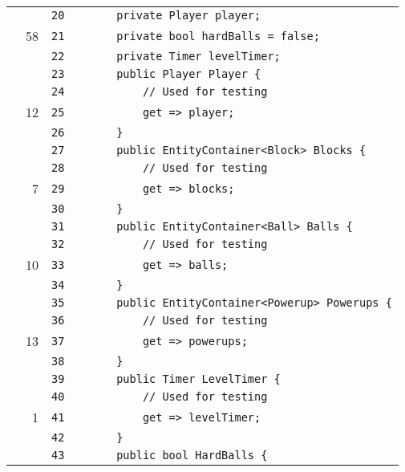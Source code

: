 \documentclass[a4paper,landscape,10pt]{article}
\begin{document}
\begin{longtable}[l]{lrrll}
\cellcolor{gray} &  & \verb~20~ & & \verb~    private Player player;~\\
\cellcolor{green} & 58 & \verb~21~ & & \verb~    private bool hardBalls = false;~\\
\cellcolor{gray} &  & \verb~22~ & & \verb~    private Timer levelTimer;~\\
\cellcolor{gray} &  & \verb~23~ & & \verb~    public Player Player {~\\
\cellcolor{gray} &  & \verb~24~ & & \verb~        // Used for testing~\\
\cellcolor{green} & 12 & \verb~25~ & & \verb~        get => player;~\\
\cellcolor{gray} &  & \verb~26~ & & \verb~    }~\\
\cellcolor{gray} &  & \verb~27~ & & \verb~    public EntityContainer<Block> Blocks {~\\
\cellcolor{gray} &  & \verb~28~ & & \verb~        // Used for testing~\\
\cellcolor{green} & 7 & \verb~29~ & & \verb~        get => blocks;~\\
\cellcolor{gray} &  & \verb~30~ & & \verb~    }~\\
\cellcolor{gray} &  & \verb~31~ & & \verb~    public EntityContainer<Ball> Balls {~\\
\cellcolor{gray} &  & \verb~32~ & & \verb~        // Used for testing~\\
\cellcolor{green} & 10 & \verb~33~ & & \verb~        get => balls;~\\
\cellcolor{gray} &  & \verb~34~ & & \verb~    }~\\
\cellcolor{gray} &  & \verb~35~ & & \verb~    public EntityContainer<Powerup> Powerups {~\\
\cellcolor{gray} &  & \verb~36~ & & \verb~        // Used for testing~\\
\cellcolor{green} & 13 & \verb~37~ & & \verb~        get => powerups;~\\
\cellcolor{gray} &  & \verb~38~ & & \verb~    }~\\
\cellcolor{gray} &  & \verb~39~ & & \verb~    public Timer LevelTimer {~\\
\cellcolor{gray} &  & \verb~40~ & & \verb~        // Used for testing~\\
\cellcolor{green} & 1 & \verb~41~ & & \verb~        get => levelTimer;~\\
\cellcolor{gray} &  & \verb~42~ & & \verb~    }~\\
\cellcolor{gray} &  & \verb~43~ & & \verb~    public bool HardBalls {~\\

\end{longtable}
\end{document}
